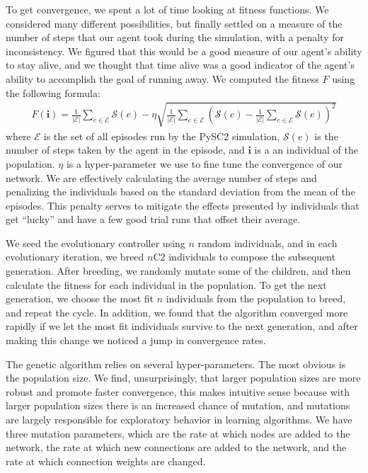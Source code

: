 \documentclass{article}
\begin{document}
\begin{multicols}{2}
To get convergence, we spent a lot of time looking at fitness functions. We
considered many different possibilities, but finally settled on a measure of the
number of steps that our agent took during the simulation, with a penalty for
inconsistency. We figured that this would be a good measure of our agent's
ability to stay alive, and we thought that time alive was a good indicator of
the agent's ability to accomplish the goal of running away. We computed the
fitness $F$ using the following formula:
\begin{align}\label{eq:fitness}
  F(\bm{i}) = \frac{1}{|\bm{\mathcal{E}}|} \sum_{e
\in \bm{\mathcal{E}}} \mathcal{S}(e) - \eta\sqrt{\frac{1}{|\bm{\mathcal{E}}|}
\sum_{e \in \bm{\mathcal{E}}}\left(\mathcal{S}(e) - \frac{1}{|\bm{\mathcal{E}}|}
\sum_{e \in \bm{\mathcal{E}}} \mathcal{S}(e)\right)^2}
\end{align}
where $\bm{\mathcal{E}}$ is the set of all episodes run by the PySC2
simulation, $\mathcal{S}(e)$ is the number of steps taken by the agent in the
episode, and $\bm{i}$ is a an individual of the population. $\eta$ is a
hyper-parameter we use to fine tune the convergence of our network. We are
effectively calculating the average number of steps and penalizing the
individuals based on the standard deviation from the mean of the episodes. This
penalty serves to mitigate the effects presented by individuals that get
``lucky'' and have a few good trial runs that offset their average.

We seed the evolutionary controller using $n$ random individuals, and in each
evolutionary iteration, we breed $n\text{C}2$ individuals to compose the
subsequent generation. After breeding, we randomly mutate some of the children,
and then calculate the fitness for each individual in the population. To get the
next generation, we choose the most fit $n$ individuals from the population to
breed, and repeat the cycle. In addition, we found that the algorithm converged
more rapidly if we let the most fit individuals survive to the next generation,
and after making this change we noticed a jump in convergence rates.

The genetic algorithm relies on several hyper-parameters. The most obvious is
the population size. We find, unsurprisingly, that larger population sizes are
more robust and promote faster convergence, this makes intuitive sense because
with larger population sizes there is an increased chance of mutation, and
mutations are largely responsible for exploratory behavior in learning
algorithms. We have three mutation parameters, which are the rate at which nodes
are added to the network, the rate at which new connections are added to the
network, and the rate at which connection weights are changed.


\end{multicols}
\end{document}
